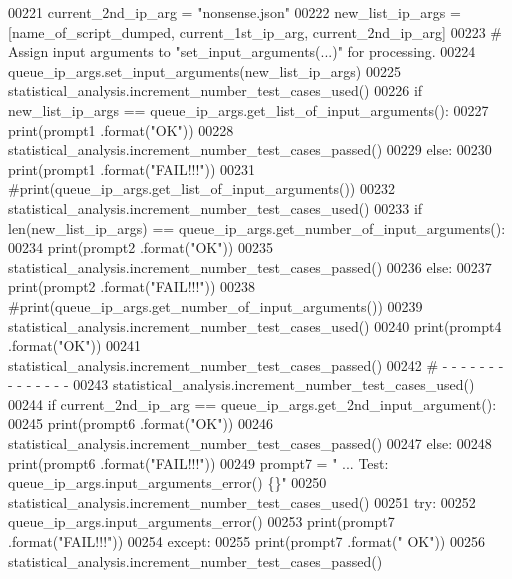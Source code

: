 \begin{DoxyCode}
00221         current\_2nd\_ip\_arg = \textcolor{stringliteral}{"nonsense.json"}
00222         new\_list\_ip\_args = [name\_of\_script\_dumped, current\_1st\_ip\_arg, current\_2nd\_ip\_arg]
00223         \textcolor{comment}{#   Assign input arguments to "set\_input\_arguments(...)" for processing.}
00224         queue\_ip\_args.set\_input\_arguments(new\_list\_ip\_args)
00225         statistical\_analysis.increment\_number\_test\_cases\_used()
00226         \textcolor{keywordflow}{if} new\_list\_ip\_args == queue\_ip\_args.get\_list\_of\_input\_arguments():
00227             print(prompt1 .format(\textcolor{stringliteral}{"OK"}))
00228             statistical\_analysis.increment\_number\_test\_cases\_passed()
00229         \textcolor{keywordflow}{else}:
00230             print(prompt1 .format(\textcolor{stringliteral}{"FAIL!!!"}))
00231             \textcolor{comment}{#print(queue\_ip\_args.get\_list\_of\_input\_arguments())}
00232         statistical\_analysis.increment\_number\_test\_cases\_used()
00233         \textcolor{keywordflow}{if} len(new\_list\_ip\_args) == queue\_ip\_args.get\_number\_of\_input\_arguments():
00234             print(prompt2 .format(\textcolor{stringliteral}{"OK"}))
00235             statistical\_analysis.increment\_number\_test\_cases\_passed()
00236         \textcolor{keywordflow}{else}:
00237             print(prompt2 .format(\textcolor{stringliteral}{"FAIL!!!"}))
00238             \textcolor{comment}{#print(queue\_ip\_args.get\_number\_of\_input\_arguments())}
00239         statistical\_analysis.increment\_number\_test\_cases\_used()
00240         print(prompt4 .format(\textcolor{stringliteral}{"OK"}))
00241         statistical\_analysis.increment\_number\_test\_cases\_passed()
00242         \textcolor{comment}{#   -   -   -   -   -   -   -   -   -   -   -   -   -   -}
00243         statistical\_analysis.increment\_number\_test\_cases\_used()
00244         \textcolor{keywordflow}{if} current\_2nd\_ip\_arg == queue\_ip\_args.get\_2nd\_input\_argument():
00245             print(prompt6 .format(\textcolor{stringliteral}{"OK"}))
00246             statistical\_analysis.increment\_number\_test\_cases\_passed()
00247         \textcolor{keywordflow}{else}:
00248             print(prompt6 .format(\textcolor{stringliteral}{"FAIL!!!"}))
00249         prompt7 = \textcolor{stringliteral}{" ... Test: queue\_ip\_args.input\_arguments\_error() \{\}"}
00250         statistical\_analysis.increment\_number\_test\_cases\_used()
00251         \textcolor{keywordflow}{try}:
00252             queue\_ip\_args.input\_arguments\_error()
00253             print(prompt7 .format(\textcolor{stringliteral}{"FAIL!!!"}))
00254         \textcolor{keywordflow}{except}:
00255             print(prompt7 .format(\textcolor{stringliteral}{" OK"}))
00256             statistical\_analysis.increment\_number\_test\_cases\_passed()
\end{DoxyCode}
